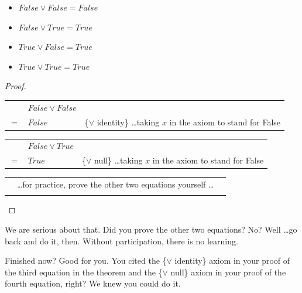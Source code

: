 \label{or-truth-table}
\begin{theorem}
\mbox{}
\begin{itemize}
\item $False \vee False = False$
\item $False \vee True  = True$
\item $True  \vee False = True$
\item $True  \vee True  = True$
\end{itemize}
\end{theorem}

\begin{proof}
\mbox{} \\
\begin{tabular}{llp{3.15in}}
    & $False \vee False$               & \\
$=$ & $False$                          & \{$\vee$ identity\} \dots taking $x$ in the axiom to stand for False \\
\end{tabular}

\begin{tabular}{llp{3.15in}}
    & $False \vee True$                & \\
$=$ & $True$                           & \{$\vee$ null\} \dots taking $x$ in the axiom to stand for False \\
\end{tabular}

\begin{tabular}{lll}
& \dots for practice, prove the other two equations yourself \dots & \\                              & \\
\end{tabular}

\end{proof}

We are serious about that. Did you prove the other two equations?
No? Well \dots go back and do it, then. Without participation, there
is no learning.

Finished now? Good for you. You cited the \{$\vee$ identity\} axiom in your
proof of the third equation in the theorem and the \{$\vee$ null\}
axiom in your proof of the fourth equation, right? We knew you could do it.

